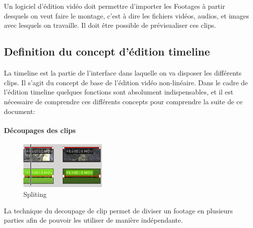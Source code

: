 Un logiciel d'édition vidéo doit permettre d'importer les Footages
 à partir desquels on veut faire le montage, c'est
à dire les fichiers vidéos, audios, et images avec lesquels on
travaille. Il doit être possible de prévisualiser ces clips.

\subsection{Definition du concept d'édition timeline}

\paragraph{}

La timeline est la partie de l'interface dans laquelle on va disposer
les différents clips. Il s'agit du concept de base de l'édition vidéo
non-linéaire.  Dans le cadre de l'édition timeline quelques fonctions
sont absolument indispensables, et il est nécessaire de comprendre ces
différents concepts pour comprendre la suite de ce document:

\paragraph{Découpages des clips}

\begin{figure}

  \vspace{-20pt} \begin{center}

    \includegraphics[width=0.38\textwidth]{images/splited}

  \end{center} \vspace{-20pt} \caption{Spliting} \label{Yes}

  \vspace{-10pt}

\end{figure}

La technique du decoupage de clip permet de diviser un footage en
plusieurs parties afin de pouvoir les utiliser de manière indépendante.

